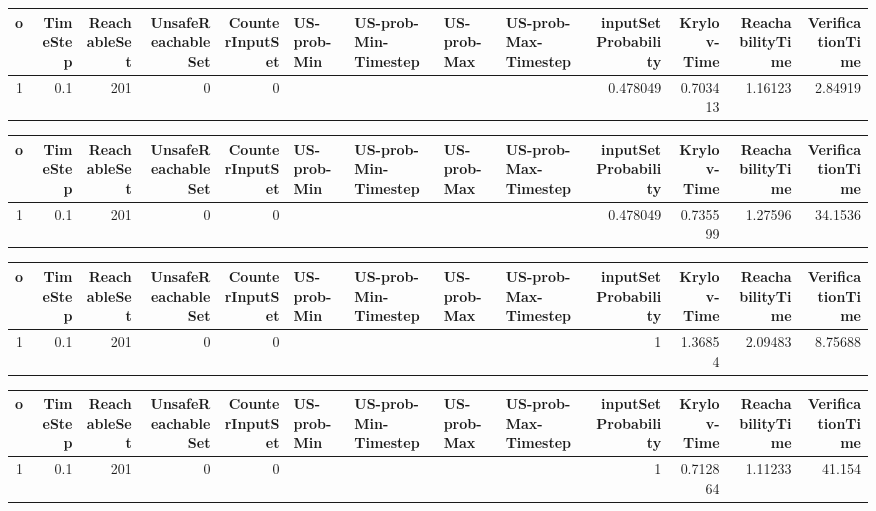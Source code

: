 \begin{tabular}{rrrrrllllrrrr}
\hline
   o &   TimeStep &   ReachableSet &   UnsafeReachableSet &   CounterInputSet & US-prob-Min   & US-prob-Min-Timestep   & US-prob-Max   & US-prob-Max-Timestep   &   inputSet Probability &   Krylov-Time &   ReachabilityTime &   VerificationTime \\
\hline
   1 &        0.1 &            201 &                    0 &                 0 &               &                        &               &                        &               0.478049 &      0.703413 &            1.16123 &            2.84919 \\
\hline
\end{tabular}
\begin{tabular}{rrrrrllllrrrr}
\hline
   o &   TimeStep &   ReachableSet &   UnsafeReachableSet &   CounterInputSet & US-prob-Min   & US-prob-Min-Timestep   & US-prob-Max   & US-prob-Max-Timestep   &   inputSet Probability &   Krylov-Time &   ReachabilityTime &   VerificationTime \\
\hline
   1 &        0.1 &            201 &                    0 &                 0 &               &                        &               &                        &               0.478049 &      0.735599 &            1.27596 &            34.1536 \\
\hline
\end{tabular}
\begin{tabular}{rrrrrllllrrrr}
\hline
   o &   TimeStep &   ReachableSet &   UnsafeReachableSet &   CounterInputSet & US-prob-Min   & US-prob-Min-Timestep   & US-prob-Max   & US-prob-Max-Timestep   &   inputSet Probability &   Krylov-Time &   ReachabilityTime &   VerificationTime \\
\hline
   1 &        0.1 &            201 &                    0 &                 0 &               &                        &               &                        &                      1 &       1.36854 &            2.09483 &            8.75688 \\
\hline
\end{tabular}
\begin{tabular}{rrrrrllllrrrr}
\hline
   o &   TimeStep &   ReachableSet &   UnsafeReachableSet &   CounterInputSet & US-prob-Min   & US-prob-Min-Timestep   & US-prob-Max   & US-prob-Max-Timestep   &   inputSet Probability &   Krylov-Time &   ReachabilityTime &   VerificationTime \\
\hline
   1 &        0.1 &            201 &                    0 &                 0 &               &                        &               &                        &                      1 &      0.712864 &            1.11233 &             41.154 \\
\hline
\end{tabular}
